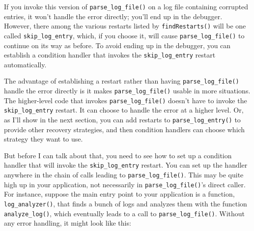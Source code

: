 \begin{Shaded}
\begin{Highlighting}[]
\StringTok{ }
  \StringTok{ }
  
    \NormalTok{(}
       
    \NormalTok{)}
  \NormalTok{\})}
\NormalTok{\}}
\end{Highlighting}
\end{Shaded}

If you invoke this version of \texttt{parse\_log\_file()} on a log file
containing corrupted entries, it won't handle the error directly; you'll
end up in the debugger. However, there among the various restarts listed
by \texttt{findRestarts()} will be one called \texttt{skip\_log\_entry},
which, if you choose it, will cause \texttt{parse\_log\_file()} to
continue on its way as before. To avoid ending up in the debugger, you
can establish a condition handler that invokes the
\texttt{skip\_log\_entry} restart automatically.

The advantage of establishing a restart rather than having
\texttt{parse\_log\_file()} handle the error directly is it makes
\texttt{parse\_log\_file()} usable in more situations. The higher-level
code that invokes \texttt{parse\_log\_file()} doesn't have to invoke the
\texttt{skip\_log\_entry} restart. It can choose to handle the error at
a higher level. Or, as I'll show in the next section, you can add
restarts to \texttt{parse\_log\_entry()} to provide other recovery
strategies, and then condition handlers can choose which strategy they
want to use.

But before I can talk about that, you need to see how to set up a
condition handler that will invoke the \texttt{skip\_log\_entry}
restart. You can set up the handler anywhere in the chain of calls
leading to \texttt{parse\_log\_file()}. This may be quite high up in
your application, not necessarily in \texttt{parse\_log\_file()}'s
direct caller. For instance, suppose the main entry point to your
application is a function, \texttt{log\_analyzer()}, that finds a bunch
of logs and analyzes them with the function \texttt{analyze\_log()},
which eventually leads to a call to \texttt{parse\_log\_file()}. Without
any error handling, it might look like this:


